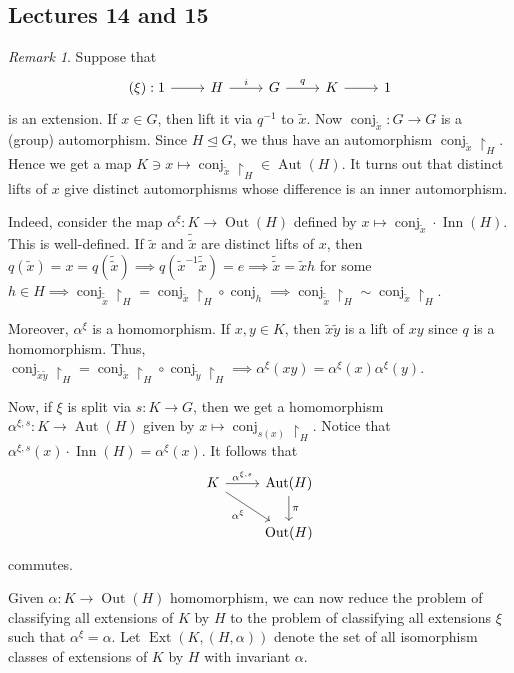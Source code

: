 \documentclass[10pt,letterpaper,cm]{nupset}
\theoremstyle{definition}
\theoremstyle{theorem}
\theoremstyle{remark}
\newtheorem{remark}[definition]{Remark}
\newcommand{\1}{\mathbf{1}}
\newcommand{\0}{\vec 0}
\DeclareMathOperator{\aut}{Aut}
\DeclareMathOperator{\ext}{Ext}
\DeclareMathOperator{\inn}{Inn}
\DeclareMathOperator{\out}{Out}
\DeclareMathOperator{\conj}{conj}
\begin{document}
\subsection{Lectures 14 and 15}

\begin{remark} 
Suppose that 
\[ 
\begin{tikzcd}
(\xi): 1 \arrow[r] & H \arrow[r, "i"] & G \arrow[r, "q"] & K \arrow[r] & 1
\end{tikzcd}
\]
is an extension. If $x \in G$, then lift it via $q^{-1}$ to $\tilde{x}$. Now $\conj_{\tilde{x}} : G \to G$ is a (group) automorphism. Since $H\unlhd G$, we thus have an automorphism $\conj_{\tilde{x}}\restriction_H$. Hence we get a map $K \ni x \mapsto \conj_{\tilde{x}}\restriction_H \in \aut(H)$. It turns out that distinct lifts of $x$ give distinct automorphisms whose difference is an inner automorphism.

Indeed, consider the map $\alpha^{\xi} : K \to \out(H)$ defined by $x \mapsto \conj_{\tilde{x}}\cdot \inn(H)$. This is well-defined. If $\tilde{x}$ and $\tilde{\tilde{x}}$ are distinct lifts of $x$, then $q(\tilde{x}) = x = q(\tilde{\tilde{x}}) \implies q(\tilde{x}^{-1}\tilde{\tilde{x}}) = e \implies \tilde{\tilde{x}} = \tilde{x}h$ for some $h \in H \implies \conj_{\tilde{\tilde{x}}}\restriction_H= \conj_{\tilde{x}}\restriction_H \circ \conj_h \implies \conj_{\tilde{\tilde{x}}}\restriction_H\sim \conj_{\tilde{x}}\restriction_H$.

Moreover, $\alpha^{\xi}$ is a homomorphism. If $x, y \in K$, then $\tilde{x}\tilde{y}$ is a lift of $xy$ since $q$ is a homomorphism.  Thus, $\conj_{\tilde{x}\tilde{y}}\restriction_H = \conj_{\tilde{x}}\restriction_H \circ \conj_{\tilde{y}}\restriction_H \implies \alpha^{\xi}(xy) = \alpha^{\xi}(x) \alpha^{\xi}(y)$.

Now, if $\xi$ is split via $s: K \to G$, then we get a homomorphism $\alpha^{\xi, s} : K \to \aut(H)$ given by $x \mapsto \conj_{s(x)}\restriction_H$. Notice that $\alpha^{\xi, s}(x)\cdot \inn(H) = \alpha^{\xi}(x)$. It follows that 
\[
\begin{tikzcd}
K \arrow[r, "{\alpha^{\xi, s}}"] \arrow[rd, "\alpha^{\xi}"'] & \aut(H) \arrow[d, "\pi"] \\
 & \out(H)
\end{tikzcd}
\]
commutes.

Given $\alpha: K \to \out(H)$ homomorphism, we can now reduce the problem of classifying all extensions of $K$ by $H$ to the problem of classifying all extensions $\xi$ such that $\alpha^{\xi} = \alpha$. 
Let $\ext(K, (H, \alpha))$ denote the set of all isomorphism classes of extensions of $K$ by $H$ with invariant $\alpha$.
\end{remark}
\end{document}
